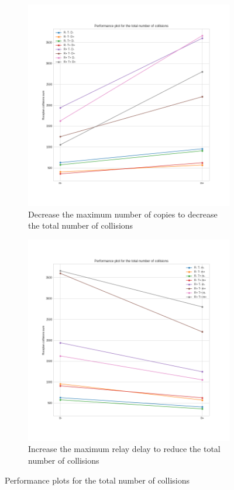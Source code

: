 \begin{figure}[htb]
	\centering
	\begin{subfigure}[b]{0.49\textwidth}
		\centering
		\includegraphics[width=\textwidth]{img/ld/collisions-m-perfplot}
		\caption{Decrease the maximum number of copies to decrease the
		total number of collisions}\label{subfig:ldperfcollisionsm}
	\end{subfigure}
	\begin{subfigure}[b]{0.49\textwidth}
		\centering
		\includegraphics[width=\textwidth]{img/ld/collisions-D-perfplot}
		\caption{Increase the maximum relay delay to reduce the total
		number of collisions}\label{subfig:ldperfcollisionsD}
	\end{subfigure}
	\caption{Performance plots for the total number of
	collisions}\label{fig:ldperfcollisions}
\end{figure}
